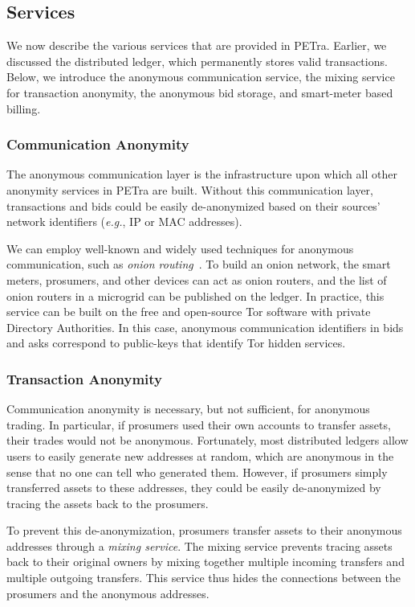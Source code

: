 \subsection{Services}

We now describe the various services that are provided in PETra.
Earlier, we discussed the distributed ledger, which permanently stores
valid transactions.  Below, we introduce the anonymous communication
service, the mixing service for transaction anonymity, the anonymous
bid storage, and smart-meter based billing.

\subsubsection{Communication Anonymity}
The anonymous communication layer is the infrastructure upon which all
other anonymity services in PETra are built.  Without this communication
layer, transactions and bids could be easily de-anonymized based on
their sources' network identifiers (\emph{e.g.}, IP or MAC addresses).

We can employ well-known and widely used techniques for anonymous
communication, such as \emph{onion routing}~\cite{reed1998anonymous}.
To build an onion network, the smart meters, prosumers, and other
devices can act as onion routers, and the list of onion routers in a
microgrid can be published on the ledger.  In practice, this service 
can be built on 
the free and open-source Tor software with private Directory
Authorities.  In this case, anonymous communication identifiers in
bids and asks correspond to public-keys that identify Tor hidden
services.

\subsubsection{Transaction Anonymity}
Communication anonymity is necessary, but not sufficient, for
anonymous trading. In particular, if prosumers used their own accounts
to transfer assets, their trades would not be anonymous.  Fortunately,
most distributed ledgers allow users to easily generate new addresses
at random, which are anonymous in the sense that no one can tell who
generated them.  However, if prosumers simply transferred assets to these
addresses, they could be easily de-anonymized by tracing the
assets back to the prosumers.

To prevent this de-anonymization, prosumers transfer assets to their
anonymous addresses through a \emph{mixing service}.  The mixing
service prevents tracing assets back to their original owners by
mixing together multiple incoming transfers and multiple outgoing
transfers. This service thus hides the connections between the
prosumers and the anonymous addresses.

